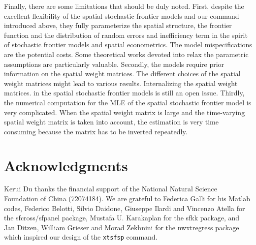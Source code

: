 Finally, there are some limitations that should be duly noted.  First, despite the excellent flexibility of the spatial stochastic frontier models and our command introduced above, they fully parameterize the spatial structure, the frontier function and the distribution of random errors and inefficiency term in the spirit of stochastic frontier models and spatial econometrics. The model mispecifications are the potential costs. Some theoretical works devoted into relax the parametric assumptions are particularly valuable. Secondly, the models require prior information on the spatial weight matrices. The different choices of the spatial weight matrices might lead to various results.  Internalizing the spatial weight matrices. in the spatial stochastic frontier models is still an open issue. Thirdly, the numerical computation for the MLE of the spatial stochastic frontier model is very complicated. When the spatial weight matrix is large and the time-varying spatial weight matrix is taken into account, the  estimation is very time consuming because the matrix has to be inverted repeatedly. 




\section{Acknowledgments}
Kerui Du thanks the financial support of the National Natural Science Foundation of China (72074184).  We are grateful to Federica Galli for his Matlab codes, Federico Belotti, Silvio Daidone, Giuseppe Ilardi and Vincenzo Atella for the sfcross/sfpanel package, Mustafa U. Karakaplan for the sfkk package, and Jan Ditzen, William Grieser and Morad Zekhnini for the nwxtregress package which inspired our design of the {\tt xtsfsp} command. 



\endinput
